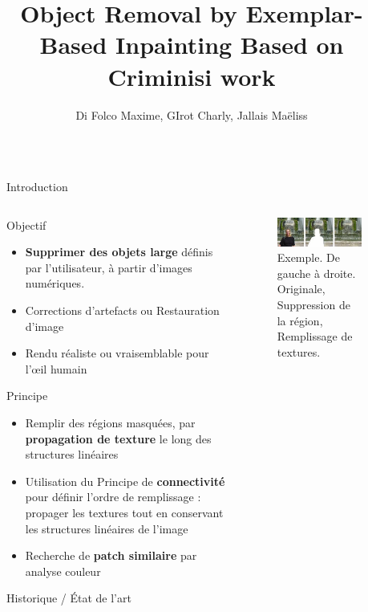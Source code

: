 \documentclass[final,hyperref={pdfpagelabels=false}]{beamer}
\title{\huge  Object Removal by Exemplar-Based Inpainting \small Based on Criminisi work}
\author{Di Folco Maxime, GIrot Charly, Jallais Maëliss}
\institute{Ecole Supérieure de Chimie Physique Électronique de Lyon}
\begin{document}
\begin{frame}[t]

\begin{columns}[t]
\begin{column}{.02\textwidth} \end{column}
\begin{column}{.930\textwidth} 
\begin{block}{\Large Introduction}
\begin{columns}[t]
\begin{column}{.496\textwidth}
Objectif
\begin{itemize} 
\item \textbf{Supprimer des objets large} définis par l'utilisateur, à partir d'images numériques. 
\item Corrections d'artefacts ou Restauration d'image
\item Rendu réaliste ou vraisemblable pour l'œil humain
\end{itemize}
Principe
\begin{itemize} 
\item Remplir des régions masquées, par \textbf{propagation de texture} le long des structures linéaires 
\item Utilisation du Principe de \textbf{connectivité} pour définir l'ordre de remplissage : propager les textures tout en conservant les structures linéaires de l'image
\item Recherche de \textbf{patch similaire} par analyse couleur
\end{itemize}

Historique / État de l'art 

 


\end{column}
\begin{column}{.496\textwidth}
\begin{figure}[!b]
\includegraphics[width=0.8\linewidth]{inpaintingex.jpeg}
\caption{Exemple. De gauche à droite. Originale, Suppression de la région, Remplissage de textures. }
\label{example}
\end{figure}
\end{column}
\end{columns}
\end{block}
\end{column}



\end{columns}
\end{frame}
\end{document}
